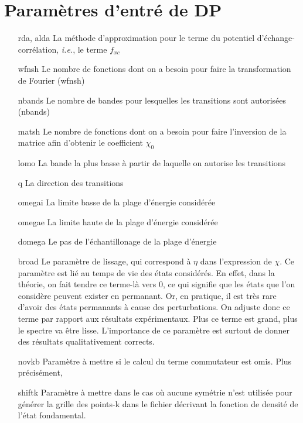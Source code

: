 \section{Paramètres d'entré de DP}
\begin{itemize}[labelwidth=, leftmargin=+, font=\bfseries]
\item[rda, alda] La méthode d'approximation pour le terme du potentiel d'échange-corrélation, \textit{i.e.}, le terme $f_{xc}$ %
\item[wfnsh] Le nombre de fonctions dont on a besoin pour faire la transformation de Fourier (wfnsh)%
\item[nbands] Le nombre de bandes pour lesquelles les transitions sont autorisées (nbands)
\item[matsh] Le nombre de fonctions dont on a besoin pour faire l'inversion de la matrice afin d'obtenir le coefficient $\chi_0$
\item[lomo] La bande la plus basse à partir de laquelle on autorise les transitions
\item[q] La direction des transitions
\item[omegai] La limite basse de la plage d'énergie considérée
\item[omegae] La limite haute de la plage d'énergie considérée
\item[domega] Le pas de l'échantillonage de la plage d'énergie
\item[broad] Le paramètre de lissage, qui correspond à $\eta$ dans l'expression de $\chi$. Ce paramètre est lié au temps de vie des états considérés. En effet, dans la théorie, on fait tendre ce terme-là vers 0, ce qui signifie que les états que l'on considère peuvent exister en permanant. Or, en pratique, il est très rare d'avoir des états permanants à cause des perturbations. On adjuste donc ce terme par rapport aux résultats expérimentaux. Plus ce terme est grand, plus le spectre va être lisse. L'importance de ce paramètre est surtout de donner des résultats qualitativement corrects.
\item[novkb] Paramètre à mettre si le calcul du terme commutateur est omis. Plus précisément, %
\item[shiftk] Paramètre à mettre dans le cas où aucune symétrie n'est utilisée pour générer la grille des points-k dans le fichier décrivant la fonction de densité de l'état fondamental.
\end{itemize}
